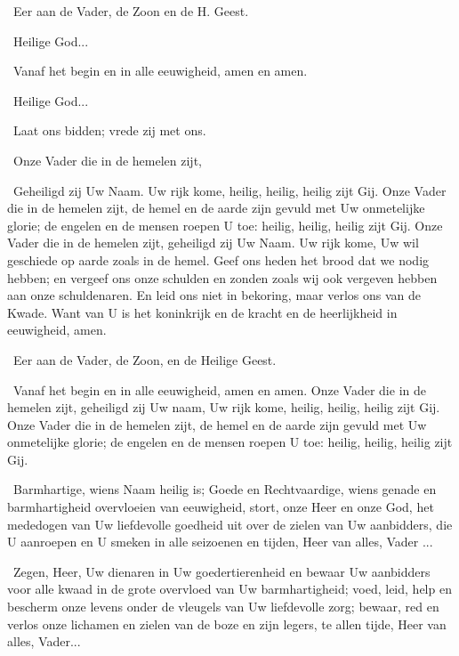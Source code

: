 \documentclass[12pt,twoside,a5paper]{article}
\begin{document}
\begin{halfparskip}
  \dd~Eer aan de Vader, de Zoon en de H. Geest.

  \rr~Heilige God...

  \dd~Vanaf het begin en in alle eeuwigheid, amen en amen.

  \rr~Heilige God...

  \rr~Laat ons bidden; vrede zij met ons.


  \cc~Onze Vader die in de hemelen zijt,

  \rr~Geheiligd zij Uw Naam. Uw rijk kome, heilig, heilig, heilig zijt Gij. Onze Vader die in de hemelen zijt, de hemel en de aarde zijn gevuld met Uw onmetelijke glorie; de engelen en de mensen roepen U toe: heilig, heilig, heilig zijt Gij. Onze Vader die in de hemelen zijt, geheiligd zij Uw Naam. Uw rijk kome, Uw wil geschiede op aarde zoals in de hemel. Geef ons heden het brood dat we nodig hebben; en vergeef ons onze schulden en zonden zoals wij ook vergeven hebben aan onze schuldenaren. En leid ons niet in bekoring, maar verlos ons van de Kwade. Want van U is het koninkrijk en de kracht en de heerlijkheid in eeuwigheid, amen.

  \cc~Eer aan de Vader, de Zoon, en de Heilige Geest.

  \rr~Vanaf het begin en in alle eeuwigheid, amen en amen. Onze Vader die in de hemelen zijt, geheiligd zij Uw naam, Uw rijk kome, heilig, heilig, heilig zijt Gij. Onze Vader die in de hemelen zijt, de hemel en de aarde zijn gevuld met Uw onmetelijke glorie; de engelen en de mensen roepen U toe: heilig, heilig, heilig zijt Gij.

  \cc~Barmhartige, wiens Naam heilig is; Goede en Rechtvaardige, wiens genade en barmhartigheid overvloeien van eeuwigheid, stort, onze Heer en onze God, het mededogen van Uw liefdevolle goedheid uit over de zielen van Uw aanbidders, die U aanroepen en U smeken in alle seizoenen en tijden, Heer van alles, Vader ...

  \cc~Zegen, Heer, Uw dienaren in Uw goedertierenheid en bewaar Uw aanbidders voor alle kwaad in de grote overvloed van Uw barmhartigheid; voed, leid, help en bescherm onze levens onder de vleugels van Uw liefdevolle zorg; bewaar, red en verlos onze lichamen en zielen van de boze en zijn legers, te allen tijde, Heer van alles, Vader...
\end{halfparskip}
\end{document}
